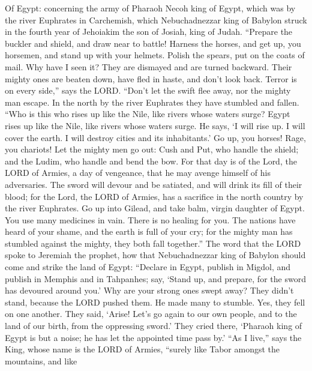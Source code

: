  Of Egypt: concerning the army of Pharaoh Necoh king of
Egypt, which was by the river Euphrates in Carchemish, which
Nebuchadnezzar king of Babylon struck in the fourth year of Jehoiakim
the son of Josiah, king of Judah.  ``Prepare the buckler
and shield, and draw near to battle!  Harness the horses,
and get up, you horsemen, and stand up with your helmets. Polish the
spears, put on the coats of mail.  Why have I seen it?
They are dismayed and are turned backward. Their mighty ones are beaten
down, have fled in haste, and don't look back. Terror is on every
side,'' says the LORD.  ``Don't let the swift flee away,
nor the mighty man escape. In the north by the river Euphrates they have
stumbled and fallen.  ``Who is this who rises up like the
Nile, like rivers whose waters surge?  Egypt rises up like
the Nile, like rivers whose waters surge. He says, `I will rise up. I
will cover the earth. I will destroy cities and its inhabitants.'
 Go up, you horses! Rage, you chariots! Let the mighty men
go out: Cush and Put, who handle the shield; and the Ludim, who handle
and bend the bow.  For that day is of the Lord, the LORD
of Armies, a day of vengeance, that he may avenge himself of his
adversaries. The sword will devour and be satiated, and will drink its
fill of their blood; for the Lord, the LORD of Armies, has a sacrifice
in the north country by the river Euphrates.  Go up into
Gilead, and take balm, virgin daughter of Egypt. You use many medicines
in vain. There is no healing for you.  The nations have
heard of your shame, and the earth is full of your cry; for the mighty
man has stumbled against the mighty, they both fall together.''
 The word that the LORD spoke to Jeremiah the prophet,
how that Nebuchadnezzar king of Babylon should come and strike the land
of Egypt:  ``Declare in Egypt, publish in Migdol, and
publish in Memphis and in Tahpanhes; say, `Stand up, and prepare, for
the sword has devoured around you.'  Why are your strong
ones swept away? They didn't stand, because the LORD pushed them.
 He made many to stumble. Yes, they fell on one another.
They said, `Arise! Let's go again to our own people, and to the land of
our birth, from the oppressing sword.'  They cried there,
`Pharaoh king of Egypt is but a noise; he has let the appointed time
pass by.'  ``As I live,'' says the King, whose name is
the LORD of Armies, ``surely like Tabor amongst the mountains, and like
